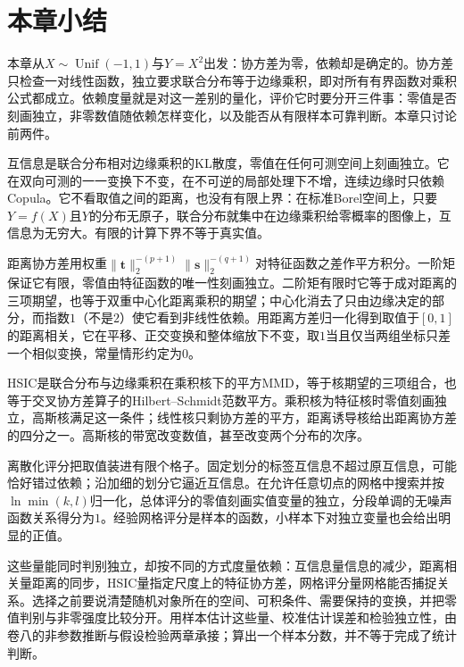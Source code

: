 \section{本章小结}
\label{sec:dep-summary}

本章从$X\sim\operatorname{Unif}(-1,1)$与$Y=X^{2}$出发：协方差为零，依赖却是确定的。协方差只检查一对线性函数，独立要求联合分布等于边缘乘积，即对所有有界函数对乘积公式都成立。依赖度量就是对这一差别的量化，评价它时要分开三件事：零值是否刻画独立，非零数值随依赖怎样变化，以及能否从有限样本可靠判断。本章只讨论前两件。

互信息是联合分布相对边缘乘积的KL散度，零值在任何可测空间上刻画独立。它在双向可测的一一变换下不变，在不可逆的局部处理下不增，连续边缘时只依赖Copula。它不看取值之间的距离，也没有有限上界：在标准Borel空间上，只要$Y=f(X)$且$Y$的分布无原子，联合分布就集中在边缘乘积给零概率的图像上，互信息为无穷大。有限的计算下界不等于真实值。

距离协方差用权重$\lVert\bm{t}\rVert_2^{-(p+1)}\lVert\bm{s}\rVert_2^{-(q+1)}$对特征函数之差作平方积分。一阶矩保证它有限，零值由特征函数的唯一性刻画独立。二阶矩有限时它等于成对距离的三项期望，也等于双重中心化距离乘积的期望；中心化消去了只由边缘决定的部分，而指数$1$（不是$2$）使它看到非线性依赖。用距离方差归一化得到取值于$[0,1]$的距离相关，它在平移、正交变换和整体缩放下不变，取$1$当且仅当两组坐标只差一个相似变换，常量情形约定为$0$。

HSIC是联合分布与边缘乘积在乘积核下的平方MMD，等于核期望的三项组合，也等于交叉协方差算子的Hilbert--Schmidt范数平方。乘积核为特征核时零值刻画独立，高斯核满足这一条件；线性核只剩协方差的平方，距离诱导核给出距离协方差的四分之一。高斯核的带宽改变数值，甚至改变两个分布的次序。

离散化评分把取值装进有限个格子。固定划分的标签互信息不超过原互信息，可能恰好错过依赖；沿加细的划分它逼近互信息。在允许任意切点的网格中搜索并按$\ln\min(k,l)$归一化，总体评分的零值刻画实值变量的独立，分段单调的无噪声函数关系得分为$1$。经验网格评分是样本的函数，小样本下对独立变量也会给出明显的正值。

这些量能同时判别独立，却按不同的方式度量依赖：互信息量信息的减少，距离相关量距离的同步，HSIC量指定尺度上的特征协方差，网格评分量网格能否捕捉关系。选择之前要说清楚随机对象所在的空间、可积条件、需要保持的变换，并把零值判别与非零强度比较分开。用样本估计这些量、校准估计误差和检验独立性，由卷八的非参数推断与假设检验两章承接；算出一个样本分数，并不等于完成了统计判断。
